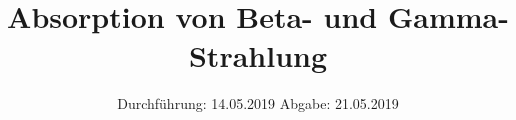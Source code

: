 

\subject{V704}
\title{Absorption von Beta- und Gamma-Strahlung}
\date{%
Durchführung: {14.05.2019}
\hspace{3em}
Abgabe: {21.05.2019}
}



\maketitle
\thispagestyle{empty}
\tableofcontents
\newpage





\printbibliography{}

